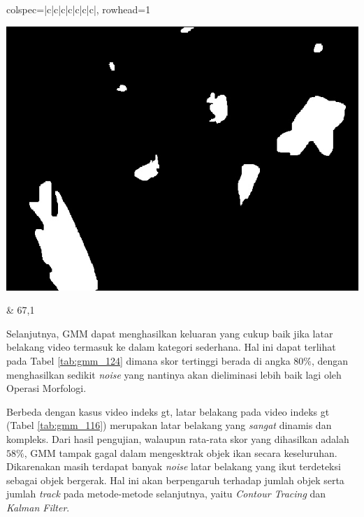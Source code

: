 \begin{longtblr}[
            caption = {Hasil uji coba proses \textit{background subtraction} menggunakan GMM terhadap video indeks gt\textunderscore124},
            label = {tab:gmm_124}
        ]{
            colspec={|c|c|c|c|c|c|c|},
            rowhead=1
        }
\begin{minipage}{0.24\textwidth}
           	\includegraphics[width=\linewidth]{image/gt_124/gt_124_groundtruth_1191.jpg}
           \end{minipage} &
            67,1 \\ \hline
        \end{longtblr}

        Selanjutnya, GMM dapat menghasilkan keluaran yang cukup baik jika latar belakang video termasuk ke dalam kategori sederhana. Hal ini dapat terlihat pada Tabel \ref{tab:gmm_124} dimana skor tertinggi berada di angka $80\%$, dengan menghasilkan sedikit \textit{noise} yang nantinya akan dieliminasi lebih baik lagi oleh Operasi Morfologi.
        
        Berbeda dengan kasus video indeks gt, latar belakang pada video indeks gt (Tabel \ref{tab:gmm_116}) merupakan latar belakang yang \textit{sangat} dinamis dan kompleks. Dari hasil pengujian, walaupun rata-rata skor yang dihasilkan adalah $58\%$, GMM tampak gagal dalam mengesktrak objek ikan secara keseluruhan. Dikarenakan masih terdapat banyak \textit{noise} latar belakang yang ikut terdeteksi sebagai objek bergerak. Hal ini akan berpengaruh terhadap jumlah objek serta jumlah \textit{track} pada metode-metode selanjutnya, yaitu \textit{Contour Tracing} dan \textit{Kalman Filter}.

